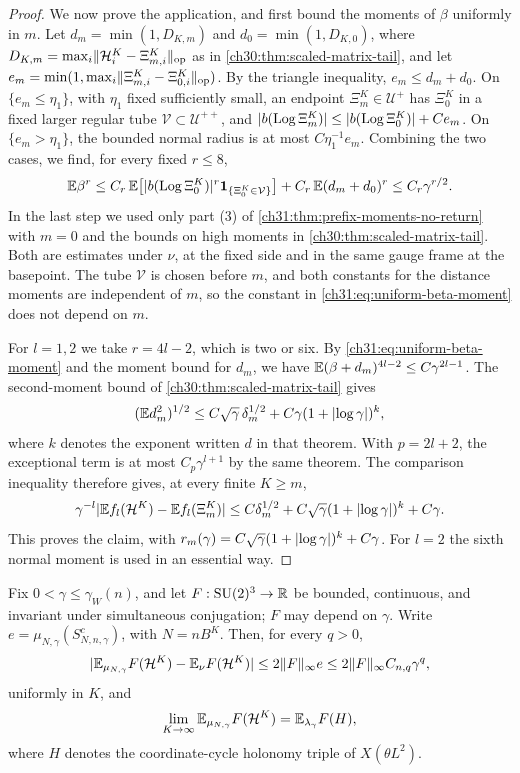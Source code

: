 \begin{proof}
We now prove the application, and first bound the moments of $\beta$ uniformly in $m$. Let $d_m=\min(1,D_{K,m})$ and $d_0=\min(1,D_{K,0})$, where $D_{K,m}=\max_i\lVert \mathcal H_i^K-\Xi_{m,i}^K\rVert_{\rm op}$ as in \cref{ch30:thm:scaled-matrix-tail}, and let $e_m=\min(1,\max_i\lVert \Xi_{m,i}^K-\Xi_{0,i}^K\rVert_{\rm op})$. By the triangle inequality, $e_m\le d_m+d_0$. On $\{e_m\le\eta_1\}$, with $\eta_1$ fixed sufficiently small, an endpoint $\Xi_m^K\in\mathcal U^+$ has $\Xi_0^K$ in a fixed larger regular tube $\mathcal V\subset\mathcal U^{++}$, and $\lvert b(\operatorname{Log}\Xi_m^K)\rvert\le\lvert b(\operatorname{Log}\Xi_0^K)\rvert+Ce_m$. On $\{e_m>\eta_1\}$, the bounded normal radius is at most $C\eta_1^{-1}e_m$. Combining the two cases, we find, for every fixed $r\le8$,
\begin{equation}\label{ch31:eq:uniform-beta-moment}
 \mathbb E\beta^r\le C_r\,\mathbb E\bigl[\lvert b(\operatorname{Log}\Xi_0^K)\rvert^r\mathbf 1_{\{\Xi_0^K\in\mathcal V\}}\bigr]+C_r\,\mathbb E(d_m+d_0)^r\le C_r\gamma^{r/2}.
\end{equation}
In the last step we used only part (3) of \cref{ch31:thm:prefix-moments-no-return} with $m=0$ and the bounds on high moments in \cref{ch30:thm:scaled-matrix-tail}. Both are estimates under $\nu$, at the fixed side and in the same gauge frame at the basepoint. The tube $\mathcal V$ is chosen before $m$, and both constants for the distance moments are independent of $m$, so the constant in \eqref{ch31:eq:uniform-beta-moment} does not depend on $m$.

For $l=1,2$ we take $r=4l-2$, which is two or six. By \eqref{ch31:eq:uniform-beta-moment} and the moment bound for $d_m$, we have $\mathbb E(\beta+d_m)^{4l-2}\le C\gamma^{2l-1}$. The second-moment bound of \cref{ch30:thm:scaled-matrix-tail} gives
\[
 (\mathbb E d_m^2)^{1/2}\le C\sqrt\gamma\,\delta_m^{1/2}+C\gamma(1+\lvert \log\gamma\rvert)^k,
\]
where $k$ denotes the exponent written $d$ in that theorem. With $p=2l+2$, the exceptional term is at most $C_p\gamma^{l+1}$ by the same theorem. The comparison inequality therefore gives, at every finite $K\ge m$,
\begin{equation}\label{ch31:eq:scaled-transport}
 \gamma^{-l}\lvert \mathbb E f_l(\mathcal H^K)-\mathbb E f_l(\Xi_m^K)\rvert\le C\delta_m^{1/2}+C\sqrt\gamma(1+\lvert \log\gamma\rvert)^k+C\gamma.
\end{equation}
This proves the claim, with $r_m(\gamma)=C\sqrt\gamma(1+\lvert \log\gamma\rvert)^k+C\gamma$. For $l=2$ the sixth normal moment is used in an essential way.
\end{proof}

\begin{lemma}\label{ch31:lem:continuum-transfer}
Fix $0<\gamma\le\gamma_W(n)$, and let $F:\mathrm{SU}(2)^3\to\mathbb R$ be bounded, continuous, and invariant under simultaneous conjugation; $F$ may depend on $\gamma$. Write $e=\mu_{N,\gamma}(S_{N,n,\gamma}^c)$, with $N=nB^K$. Then, for every $q>0$,
\[
 \lvert \mathbb E_{\mu_{N,\gamma}}F(\mathcal H^K)-\mathbb E_\nu F(\mathcal H^K)\rvert\le2\lVert F\rVert_\infty e\le2\lVert F\rVert_\infty C_{n,q}\gamma^q,
\]
uniformly in $K$, and
\[
 \lim_{K\to\infty}\mathbb E_{\mu_{N,\gamma}}F(\mathcal H^K)=\mathbb E_{\lambda_\gamma}F(H),
\]
where $H$ denotes the coordinate-cycle holonomy triple of $X(\theta L^2)$.
\end{lemma}

